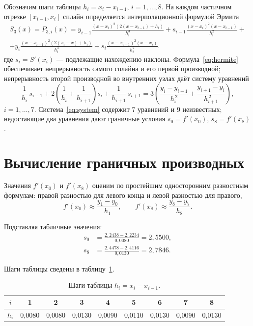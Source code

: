 \documentclass[a4paper, final]{article}
\begin{document}
Обозначим шаги таблицы $h_i = x_i - x_{i-1}$, $i = 1, \ldots, 8$. На каждом
частичном отрезке $[x_{i-1}, x_i]$ сплайн определяется интерполяционной
формулой Эрмита
\begin{multline}
S_3(x) = P_{3,i}(x) =
y_{i-1}\frac{(x - x_i)^2\left(2(x - x_{i-1}) + h_i\right)}{h_i^3}
+ s_{i-1}\frac{(x - x_i)^2 (x - x_{i-1})}{h_i^2} + \\
+ y_i\frac{(x - x_{i-1})^2\left(2(x_i - x) + h_i\right)}{h_i^3}
+ s_i\frac{(x - x_{i-1})^2 (x - x_i)}{h_i^2}.
\label{eq:hermite}
\end{multline}
где $s_i = S'(x_i)$ — подлежащие нахождению наклоны. Формула~\eqref{eq:hermite}
обеспечивает непрерывность самого сплайна и его первой производной;
непрерывность второй производной во внутренних узлах даёт систему уравнений
\begin{equation}
\frac{1}{h_i}\, s_{i-1} + 2\!\left(\frac{1}{h_i} + \frac{1}{h_{i+1}}\right)\! s_i
+ \frac{1}{h_{i+1}}\, s_{i+1}
= 3\!\left(\frac{y_i - y_{i-1}}{h_i^{\,2}} + \frac{y_{i+1} - y_i}{h_{i+1}^{\,2}}\right),
\label{eq:system}
\end{equation}
$i = 1, \ldots, 7$. Система~\eqref{eq:system} содержит 7 уравнений и 9
неизвестных; недостающие два уравнения дают граничные условия
$s_0 = f'(x_0)$, $s_8 = f'(x_8)$.

\newpage

\section{Вычисление граничных производных}

Значения $f'(x_0)$ и $f'(x_8)$ оценим по простейшим односторонним разностным
формулам: правой разностью для левого конца и левой разностью для правого,
\[
f'(x_0) \approx \frac{y_1 - y_0}{h_1}, \qquad
f'(x_8) \approx \frac{y_8 - y_7}{h_8}.
\]

Подставляя табличные значения:
\begin{align*}
s_0 &= \frac{2{,}2438 - 2{,}2234}{0{,}0080} = 2{,}5500, \\[2pt]
s_8 &= \frac{2{,}4478 - 2{,}4116}{0{,}0130} = 2{,}7846.
\end{align*}

Шаги таблицы сведены в таблицу~\ref{tab:steps}.

\begin{table}[h!]
\centering
\begin{tabular}{|c|c|c|c|c|c|c|c|c|}
\hline
$i$   & 1 & 2 & 3 & 4 & 5 & 6 & 7 & 8 \\
\hline
$h_i$ & 0,0080 & 0,0080 & 0,0130 & 0,0090 & 0,0110 & 0,0130 & 0,0090 & 0,0130 \\
\hline
\end{tabular}
\caption{Шаги таблицы $h_i = x_i - x_{i-1}$.}
\label{tab:steps}
\end{table}
\end{document}
